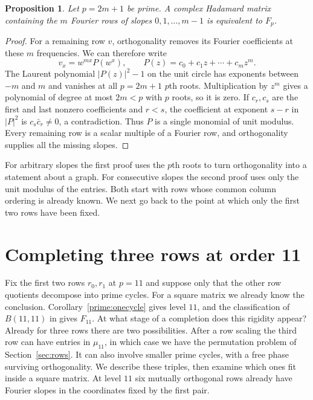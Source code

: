 \documentclass[11pt,a4paper]{article}
\newtheorem{proposition}[theorem]{Proposition}
\numberwithin{equation}{section}
\begin{document}
\begin{proposition}\label{prime:consecutive}
Let $p=2m+1$ be prime. A complex Hadamard matrix containing the $m$ Fourier rows of slopes $0,1,\ldots,m-1$ is equivalent to $F_p$.
\end{proposition}
\begin{proof}
For a remaining row $v$, orthogonality removes its Fourier coefficients at these $m$ frequencies. We can therefore write
$$v_x=w^{mx}P(w^x),\qquad P(z)=c_0+c_1z+\cdots+c_mz^m.$$
The Laurent polynomial $|P(z)|^2-1$ on the unit circle has exponents between $-m$ and $m$ and vanishes at all $p=2m+1$ $p$th roots. Multiplication by $z^m$ gives a polynomial of degree at most $2m<p$ with $p$ roots, so it is zero. If $c_r,c_s$ are the first and last nonzero coefficients and $r<s$, the coefficient at exponent $s-r$ in $|P|^2$ is $c_s\bar c_r\ne0$, a contradiction. Thus $P$ is a single monomial of unit modulus. Every remaining row is a scalar multiple of a Fourier row, and orthogonality supplies all the missing slopes.
\end{proof}

For arbitrary slopes the first proof uses the $p$th roots to turn orthogonality into a statement about a graph. For consecutive slopes the second proof uses only the unit modulus of the entries. Both start with rows whose common column ordering is already known. We next go back to the point at which only the first two rows have been fixed.

\section{Completing three rows at order 11}\label{sec:branch_A}

Fix the first two rows $r_0,r_1$ at $p=11$ and suppose only that the other row quotients decompose into prime cycles. For a square matrix we already know the conclusion. Corollary~\ref{prime:onecycle} gives level $11$, and the classification of $B(11,11)$ in \cite{hkm} gives $F_{11}$. At what stage of a completion does this rigidity appear? Already for three rows there are two possibilities. After a row scaling the third row can have entries in $\mu_{11}$, in which case we have the permutation problem of Section~\ref{sec:rows}. It can also involve smaller prime cycles, with a free phase surviving orthogonality. We describe these triples, then examine which ones fit inside a square matrix. At level $11$ six mutually orthogonal rows already have Fourier slopes in the coordinates fixed by the first pair.
\end{document}
